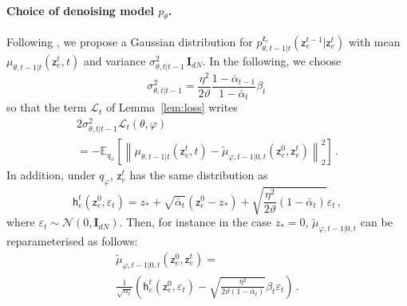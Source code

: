 \documentclass[nohyperref]{article}
\theoremstyle{plain}
\theoremstyle{definition}
\theoremstyle{remark}
\newcommand{\latentcont}{\mathsf{z}_e}
\newcommand{\latentcontpred}{\mathsf{h}_e}
\begin{document}
\paragraph{Choice of denoising model $p_\theta$.}
Following \cite{ho2020denoising}, we propose a Gaussian distribution for $p_{\theta,t-1|t}^{\latentcont}(\latentcont^{t-1}|\latentcont^{t})$ with mean $\mu_{\theta,t-1|t}(\latentcont^{t},t)$ and variance $\sigma_{\theta,t|t-1}^2\,\mathbf{I}_{dN}$. In the following, we choose $$
\sigma_{\theta,t|t-1}^2 = \frac{\eta^2}{2\vartheta}\frac{1- \bar \alpha_{t-1}}{1- \bar \alpha_{t}}\beta_t\,
$$
so that the term $\mathcal{L}_t$ of Lemma~\ref{lem:loss} writes
\begin{multline*}
    2\sigma_{\theta,t|t-1}^2\mathcal{L}_t(\theta,\varphi) \\
    = -\mathbb{E}_{q_\varphi}\left[\left\|\mu_{\theta,t-1|t}(\latentcont^{t},t) -  \tilde \mu_{\varphi,t-1|0,t}(\latentcont^0,\latentcont^t)\right\|_2^2\right]\,.
\end{multline*}
In addition, under $q_\varphi$, $\latentcont^t$ has the same distribution as
$$
\latentcontpred^t(\latentcont^{0},\varepsilon_t) = z_* + \sqrt{\bar \alpha_t}(\latentcont^{0}-z_*) + \sqrt{\frac{\eta^2}{2\vartheta}(1-\bar\alpha_t)}\varepsilon_t\,,
$$
where $\varepsilon_t \sim \mathcal{N}(0,\mathbf{I}_{dN})$. 
Then, for instance in the case $z_*=0$, $\tilde \mu_{\varphi,t-1|0,t}$ can be reparameterised as follows:
\begin{multline*}
    \tilde \mu_{\varphi,t-1|0,t}(\latentcont^0,\latentcont^t) =\\%
     \frac{1}{\sqrt{\alpha_t}}\left(\latentcontpred^t(\latentcont^0,\varepsilon_t) - \sqrt{\frac{\eta^2}{2\vartheta (1-\bar{\alpha}_t)}}\beta_t\varepsilon_t\right)\,.
\end{multline*}
\end{document}
